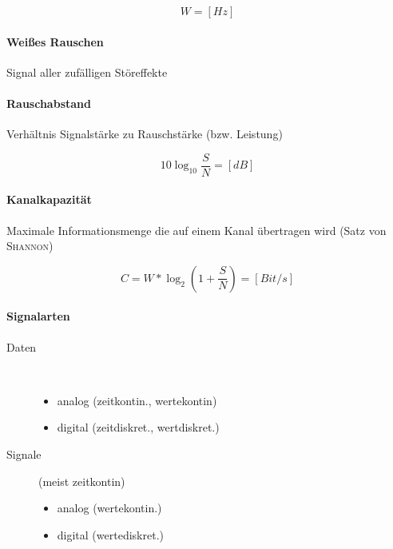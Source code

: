 $$W = [Hz]$$

\paragraph{Wei\ss es Rauschen} Signal aller zufälligen Störeffekte

\paragraph{Rauschabstand} Verhältnis Signalstärke zu Rauschstärke (bzw. Leistung)

$$10 \log_{10} \frac{S}{N} = [dB]$$

\paragraph{Kanalkapazität} Maximale Informationsmenge die auf einem Kanal übertragen wird (Satz von \textsc{Shannon})

$$C = W * \log_2 (1 + \frac{S}{N}) = [Bit/s]$$

\paragraph{Signalarten}

\begin{description}
  \item[Daten]\ \begin{itemize}
    \item analog (zeitkontin., wertekontin)
    \item digital (zeitdiskret., wertdiskret.)
  \end{itemize}

  \item[Signale] (meist zeitkontin) \begin{itemize}
      \item analog (wertekontin.)
      \item digital (wertediskret.)
    \end{itemize}
\end{description}

